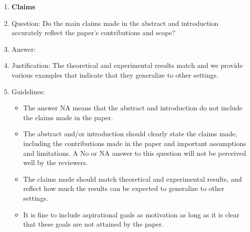 \documentclass{article} %
\newcounter{ct}
\theoremstyle{definition}
\theoremstyle{remark}
\begin{document}


\begin{enumerate}

\item {\bf Claims}
    \item[] Question: Do the main claims made in the abstract and introduction accurately reflect the paper's contributions and scope?
    \item[] Answer: \answerYes{} %
    \item[] Justification: The theoretical and experimental results match and we provide various examples that indicate that they generalize to other settings.
    \item[] Guidelines:
    \begin{itemize}
        \item The answer NA means that the abstract and introduction do not include the claims made in the paper.
        \item The abstract and/or introduction should clearly state the claims made, including the contributions made in the paper and important assumptions and limitations. A No or NA answer to this question will not be perceived well by the reviewers. 
        \item The claims made should match theoretical and experimental results, and reflect how much the results can be expected to generalize to other settings. 
        \item It is fine to include aspirational goals as motivation as long as it is clear that these goals are not attained by the paper. 
    \end{itemize}


\end{enumerate}
\end{document}
